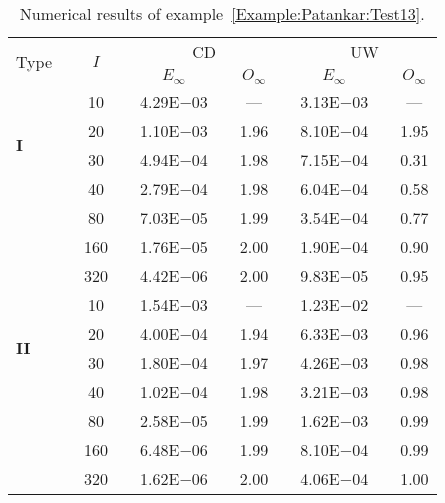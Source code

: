 {\renewcommand{\baselinestretch}{1.0}
\begin{table}[H]
\caption{Numerical results of example~\ref{Example:Patankar:Test13}.}

\setlength{\tabcolsep}{5pt}
\centering
\begin{tabular}{@{}l c c c c c c c c c c@{}}
\toprule
\multirow{2}{*}{Type} &  & \multirow{2}{*}{$I$} &  & \multicolumn{3}{c}{CD} &  & \multicolumn{3}{c}{UW} \\
\cline{5-7}
\cline{9-11}
 & & & & $E_{\infty}$ & & $O_{\infty}$ & & $E_{\infty}$ & & $O_{\infty}$\\
\midrule
\multirow{4}{*}{\textbf{I}} 
 & & 10 & & 4.29E$-$03 & & --- & & 3.13E$-$03 & & ---\\
 & & 20 & & 1.10E$-$03 & & 1.96 & & 8.10E$-$04 & & 1.95\\
 & & 30 & & 4.94E$-$04 & & 1.98 & & 7.15E$-$04 & & 0.31\\
 & & 40 & & 2.79E$-$04 & & 1.98 & & 6.04E$-$04 & & 0.58\\
 & & 80 & & 7.03E$-$05 & & 1.99 & & 3.54E$-$04 & & 0.77\\
 & & 160 & & 1.76E$-$05 & & 2.00 & & 1.90E$-$04 & & 0.90\\
 & & 320 & & 4.42E$-$06 & & 2.00 & & 9.83E$-$05 & & 0.95\\
\midrule
\multirow{4}{*}{\textbf{II}} 
 & & 10 & & 1.54E$-$03 & & --- & & 1.23E$-$02 & & ---\\
 & & 20 & & 4.00E$-$04 & & 1.94 & & 6.33E$-$03 & & 0.96\\
 & & 30 & & 1.80E$-$04 & & 1.97 & & 4.26E$-$03 & & 0.98\\
 & & 40 & & 1.02E$-$04 & & 1.98 & & 3.21E$-$03 & & 0.98\\
 & & 80 & & 2.58E$-$05 & & 1.99 & & 1.62E$-$03 & & 0.99\\
 & & 160 & & 6.48E$-$06 & & 1.99 & & 8.10E$-$04 & & 0.99\\
 & & 320 & & 1.62E$-$06 & & 2.00 & & 4.06E$-$04 & & 1.00\\
\bottomrule
\end{tabular}
\label{Table:Patankar:Test13}
\end{table}}
